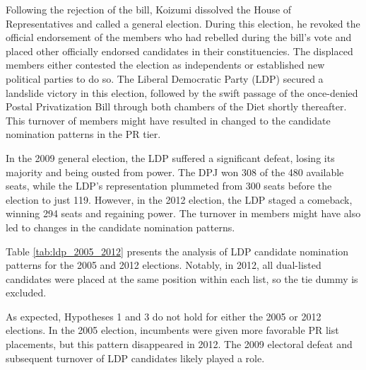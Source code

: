 \documentclass[a4paper, 11pt]{article}
\begin{document}

Following the rejection of the bill, Koizumi dissolved the House of Representatives and called a general election. During this election, he revoked the official endorsement of the members who had rebelled during the bill's vote and placed other officially endorsed candidates in their constituencies. The displaced members either contested the election as independents or established new political parties to do so. The Liberal Democratic Party (LDP) secured a landslide victory in this election, followed by the swift passage of the once-denied Postal Privatization Bill through both chambers of the Diet shortly thereafter. This turnover of members might have resulted in changed to the candidate nomination patterns in the PR tier. 

In the 2009 general election, the LDP suffered a significant defeat, losing its majority and being ousted from power.  The DPJ won 308 of the 480 available seats, while the LDP’s representation plummeted from 300 seats before the election to just 119. However, in the 2012 election, the LDP staged a comeback, winning 294 seats and regaining power. The turnover in members might have also led to changes in the candidate nomination patterns. 

Table \ref{tab:ldp_2005_2012} presents the analysis of LDP candidate nomination patterns for the 2005 and 2012 elections. Notably, in 2012, all dual-listed candidates were placed at the same position within each list, so the tie dummy is excluded.



As expected, Hypotheses 1 and 3 do not hold for either the 2005 or 2012 elections. In the 2005 election, incumbents were given more favorable PR list placements, but this pattern disappeared in 2012. The 2009 electoral defeat and subsequent turnover of LDP candidates likely played a role.
\end{document}
